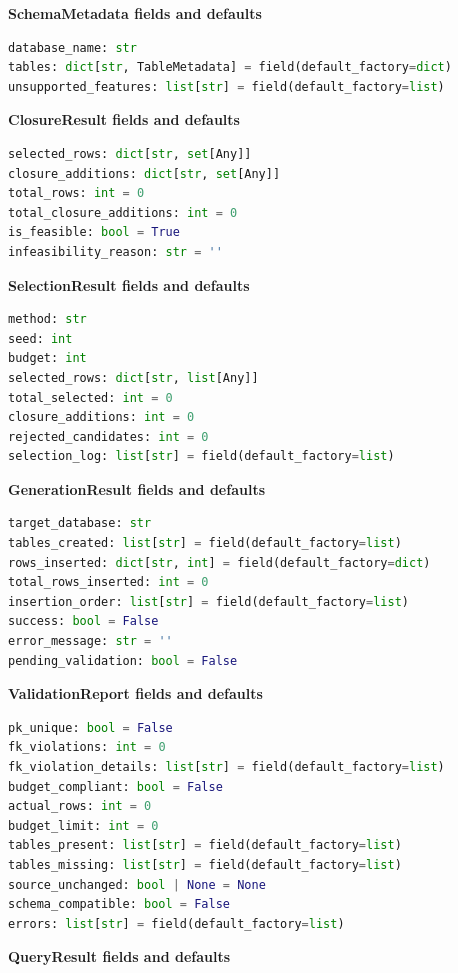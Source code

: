 \textbf{SchemaMetadata fields and defaults}


\begin{lstlisting}[language=Python]
database_name: str
tables: dict[str, TableMetadata] = field(default_factory=dict)
unsupported_features: list[str] = field(default_factory=list)
\end{lstlisting}


\textbf{ClosureResult fields and defaults}


\begin{lstlisting}[language=Python]
selected_rows: dict[str, set[Any]]
closure_additions: dict[str, set[Any]]
total_rows: int = 0
total_closure_additions: int = 0
is_feasible: bool = True
infeasibility_reason: str = ''
\end{lstlisting}


\textbf{SelectionResult fields and defaults}


\begin{lstlisting}[language=Python]
method: str
seed: int
budget: int
selected_rows: dict[str, list[Any]]
total_selected: int = 0
closure_additions: int = 0
rejected_candidates: int = 0
selection_log: list[str] = field(default_factory=list)
\end{lstlisting}


\textbf{GenerationResult fields and defaults}


\begin{lstlisting}[language=Python]
target_database: str
tables_created: list[str] = field(default_factory=list)
rows_inserted: dict[str, int] = field(default_factory=dict)
total_rows_inserted: int = 0
insertion_order: list[str] = field(default_factory=list)
success: bool = False
error_message: str = ''
pending_validation: bool = False
\end{lstlisting}


\textbf{ValidationReport fields and defaults}


\begin{lstlisting}[language=Python]
pk_unique: bool = False
fk_violations: int = 0
fk_violation_details: list[str] = field(default_factory=list)
budget_compliant: bool = False
actual_rows: int = 0
budget_limit: int = 0
tables_present: list[str] = field(default_factory=list)
tables_missing: list[str] = field(default_factory=list)
source_unchanged: bool | None = None
schema_compatible: bool = False
errors: list[str] = field(default_factory=list)
\end{lstlisting}


\textbf{QueryResult fields and defaults}


